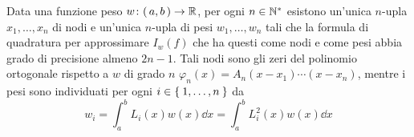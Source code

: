 	\begin{teorema}\label{th:formula-gaussiana-esiste-unica}
		Data una funzione peso \(w \colon (\, a, b \,) \to \mathbb{R}\), per ogni \(n \in \mathbb{N}^*\) esistono un'unica \(n\)-upla \(x_1, \dots, x_n\) di nodi e un'unica \(n\)-upla di pesi \(w_1, \dots, w_n\) tali che la formula di quadratura per approssimare \(I_w (f)\) che ha questi come nodi e come pesi abbia grado di precisione almeno \(2 n - 1\). Tali nodi sono gli zeri del polinomio ortogonale rispetto a \(w\) di grado \(n\) \(\varphi_n (x) = A_n (x - x_1) \cdots (x - x_n)\), mentre i pesi sono individuati per ogni \(i \in \Set{1, \dots, n}\) da
		\begin{equation}\label{eq:formule-gauss-pesi}
			w_i = \int_a^b L_i (x) w (x) \dd{x} = \int_a^b L_i^2 (x) w (x) \dd{x}
		\end{equation}
	\end{teorema}

